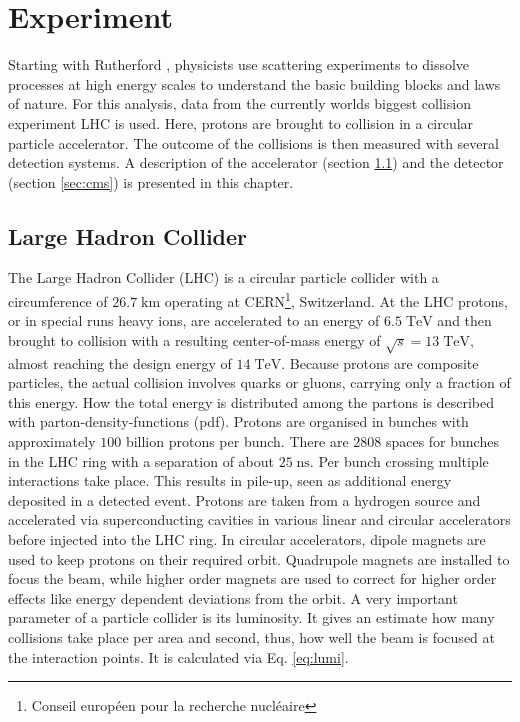\chapter{Experiment}
\label{ch:Exp}
	Starting with Rutherford \cite{Rutherford}, physicists use scattering experiments to dissolve processes at high energy scales to understand the basic building blocks and laws of nature. For this analysis, data from the currently worlds biggest collision experiment LHC is used. Here, protons are brought to collision in a circular particle accelerator. The outcome of the collisions is then measured with several detection systems. A description of the accelerator (section \ref{sec:lhc}) and the detector (section \ref{sec:cms}) is presented in this chapter.
\section{Large Hadron Collider}
\label{sec:lhc}
	The Large Hadron Collider (LHC) is a circular particle collider with a circumference of $26.7\;\text{km}$ operating at CERN\footnote{Conseil europ\'{e}en pour la recherche nucl\'{e}aire}, Switzerland. At the LHC protons, or in special runs heavy ions, are accelerated to an energy of $6.5\;\text{TeV}$ and then brought to collision with a resulting center-of-mass energy of $\sqrt{s}=13\;\text{TeV}$, almost reaching the design energy of $14\;\text{TeV}$. Because protons are composite particles, the actual collision involves quarks or gluons, carrying only a fraction of this energy. How the total energy is distributed among the partons is described with parton-density-functions (pdf). Protons are organised in bunches with approximately $100$ billion protons per bunch. There are $2808$ spaces for bunches in the LHC ring with a separation of about $25\;\text{ns}$. Per bunch crossing multiple interactions take place. This results in pile-up, seen as additional energy deposited in a detected event.	Protons are taken from a hydrogen source and accelerated via superconducting cavities in various linear and circular accelerators before injected into the LHC ring. In circular accelerators, dipole magnets are used to keep protons on their required orbit. Quadrupole magnets are installed to focus the beam, while higher order magnets are used to correct for higher order effects like energy dependent deviations from the orbit. A very important parameter of a particle collider is its luminosity. It gives an estimate how many collisions take place per area and second, thus, how well the beam is focused at the interaction points. It is calculated via Eq. \ref{eq:lumi}. 
